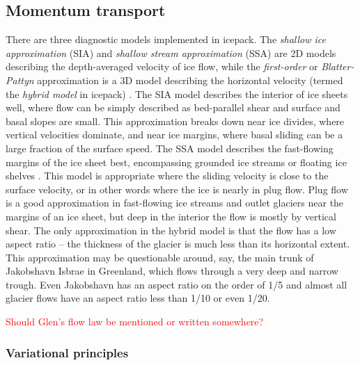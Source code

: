 \documentclass{article}
\theoremstyle{definition}
\theoremstyle{plain}
\begin{document}
\subsection{Momentum transport}

There are three diagnostic models implemented in icepack.
The \emph{shallow ice approximation} (SIA) and \emph{shallow stream approximation} (SSA) are 2D models describing the depth-averaged velocity of ice flow, while the \emph{first-order} or \emph{Blatter-Pattyn} approximation is a 3D model describing the horizontal velocity (termed the \emph{hybrid model} in icepack) \citep{blatter1995velocity, pattyn2003new}.
The SIA model \citep{hutter1981effect} describes the interior of ice sheets well, where flow can be simply described as bed-parallel shear and surface and basal slopes are small.
This approximation breaks down near ice divides, where vertical velocities dominate, and near ice margins, where basal sliding can be a large fraction of the surface speed.
The SSA model describes the fast-flowing margins of the ice sheet best, encompassing grounded ice streams or floating ice shelves \citep{macayeal1989large}.
This model is appropriate where the sliding velocity is close to the surface velocity, or in other words where the ice is nearly in plug flow.
Plug flow is a good approximation in fast-flowing ice streams and outlet glaciers near the margins of an ice sheet, but deep in the interior the flow is mostly by vertical shear.
The only approximation in the hybrid model is that the flow has a low aspect ratio -- the thickness of the glacier is much less than its horizontal extent.
This approximation may be questionable around, say, the main trunk of Jakobshavn Isbrae in Greenland, which flows through a very deep and narrow trough.
Even Jakobshavn has an aspect ratio on the order of 1/5 and almost all glacier flows have an aspect ratio less than 1/10 or even 1/20.

\textcolor{red}{Should Glen's flow law be mentioned or written somewhere?}

\subsubsection{Variational principles}
\end{document}
